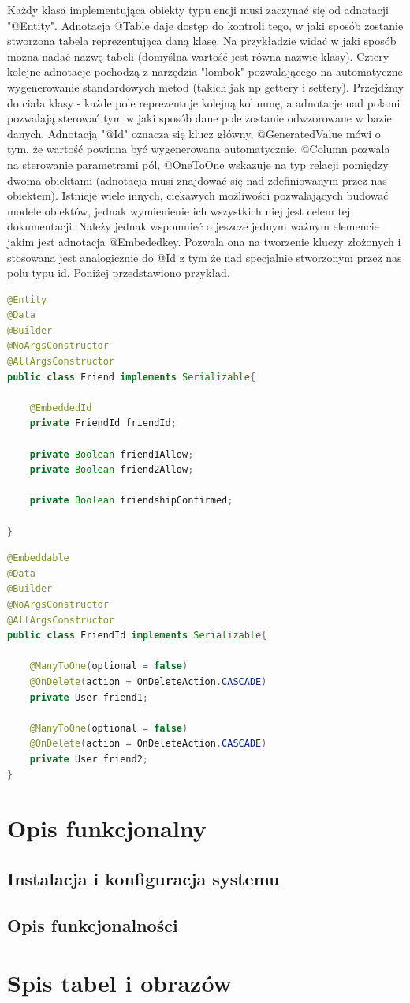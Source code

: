 \documentclass{report}
\begin{document}
		Każdy klasa implementująca obiekty typu encji musi zaczynać się od adnotacji "@Entity". Adnotacja @Table daje dostęp do kontroli tego, w jaki sposób zostanie stworzona tabela reprezentująca daną klasę. Na przykładzie widać w jaki sposób można nadać nazwę tabeli (domyślna wartość jest równa nazwie klasy). Cztery kolejne adnotacje pochodzą z narzędzia "lombok" pozwalającego na automatyczne wygenerowanie standardowych metod (takich jak np gettery i settery). Przejdźmy do ciała klasy - każde pole reprezentuje kolejną kolumnę, a adnotacje nad polami pozwalają sterować tym w jaki sposób dane pole zostanie odwzorowane w bazie danych. Adnotacją "@Id" oznacza się klucz główny, @GeneratedValue mówi o tym, że wartość powinna być wygenerowana automatycznie, @Column pozwala na sterowanie parametrami pól, @OneToOne wskazuje na typ relacji pomiędzy dwoma obiektami (adnotacja musi znajdować się nad zdefiniowanym przez nas obiektem). Istnieje wiele innych, ciekawych możliwości pozwalających budować modele obiektów, jednak wymienienie ich wszystkich niej jest celem tej dokumentacji. Należy jednak wspomnieć o jeszcze jednym ważnym elemencie jakim jest adnotacja @Embededkey. Pozwala ona na tworzenie kluczy złożonych i stosowana jest analogicznie do @Id z tym że nad specjalnie stworzonym przez nas polu typu id. Poniżej przedstawiono przykład.


		\begin{lstlisting}[language=Java, breaklines]
@Entity
@Data
@Builder
@NoArgsConstructor
@AllArgsConstructor
public class Friend implements Serializable{

    @EmbeddedId
    private FriendId friendId;

    private Boolean friend1Allow;
    private Boolean friend2Allow;

    private Boolean friendshipConfirmed;

}
		\end{lstlisting}

		\begin{lstlisting}[language=Java, breaklines]
@Embeddable
@Data
@Builder
@NoArgsConstructor
@AllArgsConstructor
public class FriendId implements Serializable{

    @ManyToOne(optional = false)
    @OnDelete(action = OnDeleteAction.CASCADE)
    private User friend1;

    @ManyToOne(optional = false)
    @OnDelete(action = OnDeleteAction.CASCADE)
    private User friend2;
}
		\end{lstlisting}


\chapter{Opis funkcjonalny}

	\section{Instalacja i konfiguracja systemu}
	
	\section{Opis funkcjonalności}


\chapter{Spis tabel i obrazów}


\begingroup
\let\clearpage\relax
\listoffigures
\listoftables
\endgroup
\end{document}
